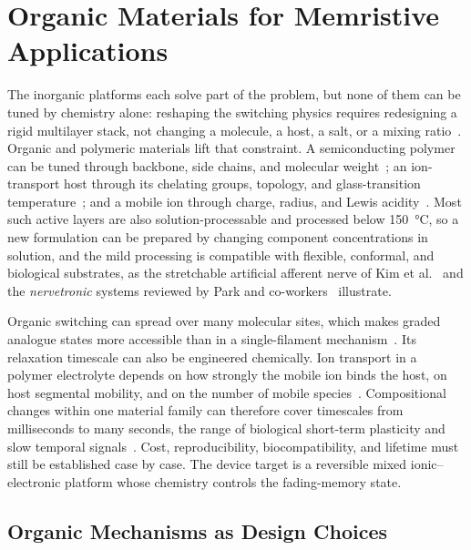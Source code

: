 \documentclass[12pt, twoside]{report}
\begin{document}
\section{Organic Materials for Memristive Applications}\label{sec:organic_memristors}

The inorganic platforms each solve part of the problem, but none of them can be tuned by chemistry alone: reshaping the switching physics requires redesigning a rigid multilayer stack, not changing a molecule, a host, a salt, or a mixing ratio~\cite{VanDeBurgt2018, Sangwan2020}. Organic and polymeric materials lift that constraint. A semiconducting polymer can be tuned through backbone, side chains, and molecular weight~\cite{Friend1999}; an ion-transport host through its chelating groups, topology, and glass-transition temperature~\cite{Gray1991, Armand1989}; and a mobile ion through charge, radius, and Lewis acidity~\cite{Pearson1963}. Most such active layers are also solution-processable and processed below \SI{150}{\celsius}, so a new formulation can be prepared by changing component concentrations in solution, and the mild processing is compatible with flexible, conformal, and biological substrates, as the stretchable artificial afferent nerve of Kim et al.~\cite{Kim2018} and the \emph{nervetronic} systems reviewed by Park and co-workers~\cite{Park2020} illustrate.

Organic switching can spread over many molecular sites, which makes graded analogue states more accessible than in a single-filament mechanism~\cite{VanDeBurgt2017, Fuller2019}. Its relaxation timescale can also be engineered chemically. Ion transport in a polymer electrolyte depends on how strongly the mobile ion binds the host, on host segmental mobility, and on the number of mobile species~\cite{Berthier1983, Gray1991}. Compositional changes within one material family can therefore cover timescales from milliseconds to many seconds, the range of biological short-term plasticity and slow temporal signals~\cite{Zucker1989, ZuckerRegehr2002}. Cost, reproducibility, biocompatibility, and lifetime must still be established case by case. The device target is a reversible mixed ionic--electronic platform whose chemistry controls the fading-memory state.

\subsection{Organic Mechanisms as Design Choices}\label{subsec:organic_mechanisms}
\end{document}
